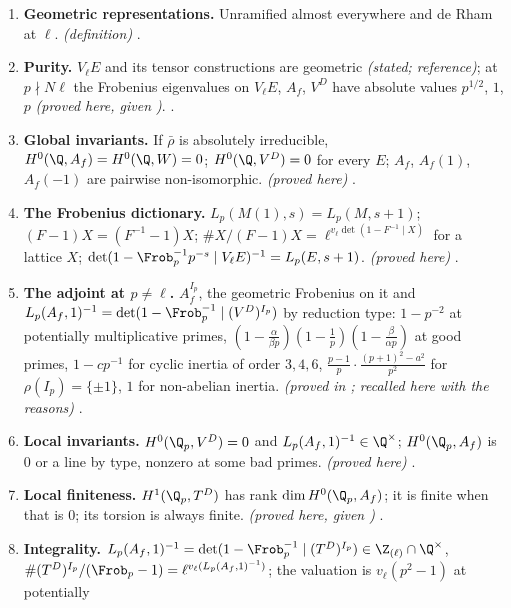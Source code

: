 \begin{enumerate}[label=\textbf{\thechapter.\arabic*}]
\emph{(proved here, given )} .
\item \textbf{Geometric representations.} Unramified almost everywhere and de Rham at $\ell$. \emph{(definition)} .
\item \textbf{Purity.} $V_\ell E$ and its tensor constructions are geometric \emph{(stated; reference)}; at $p\nmid N\ell$ the Frobenius eigenvalues on $V_\ell E$, $A_f$, $V^D$ have absolute values
$p^{1/2}$, $1$, $p$ \emph{(proved here, given )}. .
\item \sloppy \textbf{Global invariants.} If $\bar\rho$ is absolutely irreducible, $H^0(\Q,A_f)=H^0(\Q,W)=0$; $H^0(\Q,V^D)=0$ for every $E$; $A_f$, $A_f(1)$, $A_f(-1)$ are pairwise non-isomorphic.
\emph{(proved here)} .
\item \textbf{The Frobenius dictionary.} $L_p(M(1),s)=L_p(M,s+1)$; $(F-1)X=(F^{-1}-1)X$; $\#X/(F-1)X=\ell^{v_\ell\det(1-F^{-1}\mid X)}$ for a lattice $X$; $\det(1-\Frob_p^{-1}p^{-s}\mid V_\ell E)^{-1}=L_p(E,s+1)$.
\emph{(proved here)} .
\item \textbf{The adjoint at $p\ne\ell$.} $A_f^{I_p}$, the geometric Frobenius on it and $L_p(A_f,1)^{-1}=\det(1-\Frob_p^{-1}\mid(V^D)^{I_p})$ by reduction type: $1-p^{-2}$ at potentially multiplicative primes,
$(1-\frac{\alpha}{\beta p})(1-\frac1p)(1-\frac{\beta}{\alpha p})$ at good primes, $1-cp^{-1}$ for cyclic inertia of order $3,4,6$, $\frac{p-1}p\cdot\frac{(p+1)^2-a^2}{p^2}$ for $\rho(I_p)=\{\pm1\}$, $1$ for non-abelian
inertia. \emph{(proved in ; recalled here with the reasons)} .
\item \textbf{Local invariants.} $H^0(\Q_p,V^D)=0$ and $L_p(A_f,1)^{-1}\in\Q^\times$; $H^0(\Q_p,A_f)$ is $0$ or a line by type, nonzero at some bad primes. \emph{(proved here)}
.
\item \textbf{Local finiteness.} $H^1(\Q_p,T^D)$ has rank $\dim H^0(\Q_p,A_f)$; it is finite when that is $0$; its torsion is always finite. \emph{(proved here, given )}
.
\item \textbf{Integrality.} $L_p(A_f,1)^{-1}=\det(1-\Frob_p^{-1}\mid(T^D)^{I_p})\in\Z_{(\ell)}\cap\Q^\times$, $\#(T^D)^{I_p}/(\Frob_p-1)=\ell^{v_\ell(L_p(A_f,1)^{-1})}$; the valuation is $v_\ell(p^2-1)$ at potentially

\end{enumerate}
